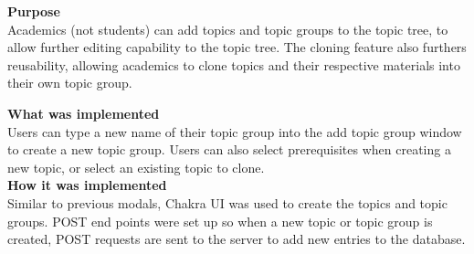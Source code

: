 \textbf{Purpose} \\
Academics (not students) can add topics and topic groups to the topic tree, to allow further editing capability to the topic tree. The cloning feature also furthers reusability, allowing academics to clone topics and their respective materials into their own topic group.

\textbf{What was implemented} \\
Users can type a new name of their topic group into the add topic group window to create a new topic group. Users can also select prerequisites when creating a new topic, or select an existing topic to clone. \\

\textbf{How it was implemented} \\
Similar to previous modals, Chakra UI was used to create the topics and topic groups. POST end points were set up so when a new topic or topic group is created, POST requests are sent to the server to add new entries to the database.